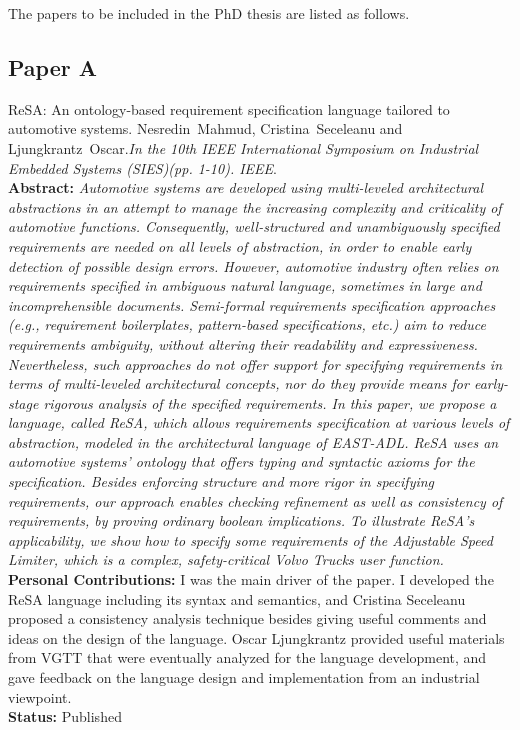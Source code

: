 The papers to be included in the PhD thesis are listed as follows.

\subsection*{Paper A}
ReSA: An ontology-based requirement specification language tailored to automotive systems. Nesredin~Mahmud, Cristina~Seceleanu and Ljungkrantz~Oscar.\textit{In the 10th IEEE International Symposium on Industrial Embedded Systems (SIES)(pp. 1-10). IEEE}.\label{lbl_resa}\\[6pt]
\textbf{Abstract:} \textit{Automotive systems are developed using multi-leveled architectural abstractions in an attempt to manage the increasing complexity and criticality of automotive functions. Consequently, well-structured and unambiguously specified requirements are needed on all levels of abstraction, in order to enable early detection of possible design errors. However, automotive industry often relies on requirements specified in ambiguous natural language, sometimes in large and incomprehensible documents. Semi-formal requirements specification approaches (e.g., requirement boilerplates, pattern-based specifications, etc.) aim to reduce requirements ambiguity, without altering their readability and expressiveness. Nevertheless, such approaches do not offer support for specifying requirements in terms of multi-leveled architectural concepts, nor do they provide means for early-stage rigorous analysis of the specified requirements. In this paper, we propose a language, called ReSA, which allows requirements specification at various levels of abstraction, modeled in the architectural language of EAST-ADL. ReSA uses an automotive systems' ontology that offers typing and syntactic axioms for the specification. Besides enforcing structure and more rigor in specifying requirements, our approach enables checking refinement as well as consistency of requirements, by proving ordinary boolean implications. To illustrate ReSA's applicability, we show how to specify some requirements of the Adjustable Speed Limiter, which is a complex, safety-critical Volvo Trucks user function.}\\[6pt]
\textbf{Personal Contributions: }I was the main driver of the paper. I developed the ReSA language including its syntax and semantics, and Cristina Seceleanu proposed a consistency analysis technique besides giving useful comments and ideas on the design of the language. Oscar Ljungkrantz provided useful materials from VGTT that were eventually analyzed for the language development, and gave feedback on the language design and implementation from an industrial viewpoint.\\
\textbf{Status:} Published


